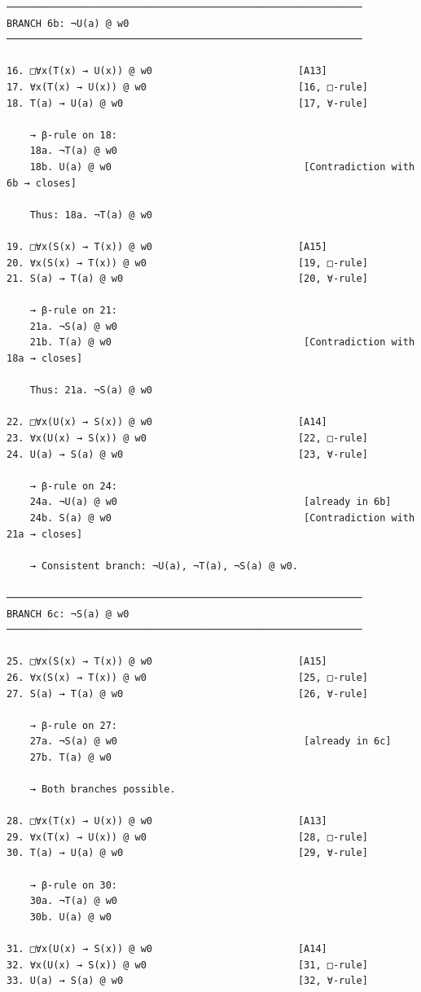 \documentclass[
]{article}
\begin{document}
\begin{verbatim}
─────────────────────────────────────────────────────────────
BRANCH 6b: ¬U(a) @ w0
─────────────────────────────────────────────────────────────

16. □∀x(T(x) → U(x)) @ w0                         [A13]
17. ∀x(T(x) → U(x)) @ w0                          [16, □-rule]
18. T(a) → U(a) @ w0                              [17, ∀-rule]

    → β-rule on 18:
    18a. ¬T(a) @ w0
    18b. U(a) @ w0                                 [Contradiction with 6b → closes]

    Thus: 18a. ¬T(a) @ w0

19. □∀x(S(x) → T(x)) @ w0                         [A15]
20. ∀x(S(x) → T(x)) @ w0                          [19, □-rule]
21. S(a) → T(a) @ w0                              [20, ∀-rule]

    → β-rule on 21:
    21a. ¬S(a) @ w0
    21b. T(a) @ w0                                 [Contradiction with 18a → closes]

    Thus: 21a. ¬S(a) @ w0

22. □∀x(U(x) → S(x)) @ w0                         [A14]
23. ∀x(U(x) → S(x)) @ w0                          [22, □-rule]
24. U(a) → S(a) @ w0                              [23, ∀-rule]

    → β-rule on 24:
    24a. ¬U(a) @ w0                                [already in 6b]
    24b. S(a) @ w0                                 [Contradiction with 21a → closes]

    → Consistent branch: ¬U(a), ¬T(a), ¬S(a) @ w0.

─────────────────────────────────────────────────────────────
BRANCH 6c: ¬S(a) @ w0
─────────────────────────────────────────────────────────────

25. □∀x(S(x) → T(x)) @ w0                         [A15]
26. ∀x(S(x) → T(x)) @ w0                          [25, □-rule]
27. S(a) → T(a) @ w0                              [26, ∀-rule]

    → β-rule on 27:
    27a. ¬S(a) @ w0                                [already in 6c]
    27b. T(a) @ w0

    → Both branches possible.

28. □∀x(T(x) → U(x)) @ w0                         [A13]
29. ∀x(T(x) → U(x)) @ w0                          [28, □-rule]
30. T(a) → U(a) @ w0                              [29, ∀-rule]

    → β-rule on 30:
    30a. ¬T(a) @ w0
    30b. U(a) @ w0

31. □∀x(U(x) → S(x)) @ w0                         [A14]
32. ∀x(U(x) → S(x)) @ w0                          [31, □-rule]
33. U(a) → S(a) @ w0                              [32, ∀-rule]


\end{verbatim}
\end{document}
